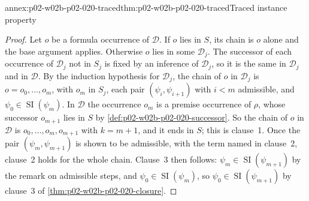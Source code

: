 \begin{annexitem}{annex:p02-w02b-p02-020-traced}{thm:p02-w02b-p02-020-traced}{Traced instance property}
\begin{proof}
Let \(o\) be a formula occurrence of \(\mathcal D\).  If \(o\) lies in \(S\),
its chain is \(o\) alone and the base argument applies.  Otherwise \(o\) lies
in some \(\mathcal D_j\).  The successor of each occurrence of
\(\mathcal D_j\) not in \(S_j\) is fixed by an inference of \(\mathcal D_j\),
so it is the same in \(\mathcal D_j\) and in \(\mathcal D\).  By the
induction hypothesis for \(\mathcal D_j\), the chain of \(o\) in
\(\mathcal D_j\) is \(o=o_0,\ldots,o_m\), with \(o_m\) in \(S_j\), each pair
\((\psi_i,\psi_{i+1})\) with \(i<m\) admissible, and
\(\psi_0\in\operatorname{SI}(\psi_m)\).  In \(\mathcal D\) the occurrence
\(o_m\) is a premise occurrence of \(\rho\), whose successor \(o_{m+1}\) lies
in \(S\) by \cref{def:p02-w02b-p02-020-successor}.  So the chain of \(o\) in
\(\mathcal D\) is \(o_0,\ldots,o_m,o_{m+1}\) with \(k=m+1\), and it ends in
\(S\); this is clause~1.  Once the pair \((\psi_m,\psi_{m+1})\) is shown to be
admissible, with the term named in clause~2, clause~2 holds for the whole
chain.  Clause~3 then follows: \(\psi_m\in\operatorname{SI}(\psi_{m+1})\) by
the remark on admissible steps, and \(\psi_0\in\operatorname{SI}(\psi_m)\), so
\(\psi_0\in\operatorname{SI}(\psi_{m+1})\) by clause~3 of
\cref{thm:p02-w02b-p02-020-closure}.


\end{proof}
\end{annexitem}
